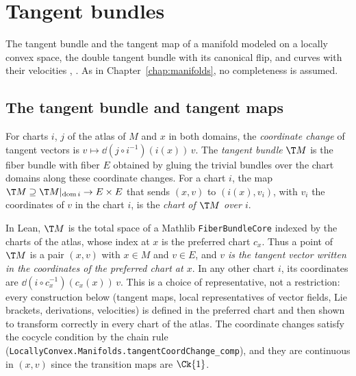 \chapter{Tangent bundles}
\label{chap:tangent}

The tangent bundle and the tangent map of a manifold modeled on a locally convex space, the
double tangent bundle with its canonical flip, and curves with their velocities
\cite[\S3.3]{GN26}, \cite[Ch.~III]{Lan99}. As in Chapter~\ref{chap:manifolds}, no completeness
is assumed.

\section{The tangent bundle and tangent maps}

\begin{definition}
  \label{def:tangent-bundle}
  \leanok
  For charts $i$, $j$ of the atlas of $M$ and $x$ in both domains, the \emph{coordinate change}
  of tangent vectors is $v \mapsto \dd(j \circ i^{-1})(i(x))\,v$. The \emph{tangent bundle}
  $\T M$ is the fiber bundle with fiber $E$ obtained by gluing the trivial bundles over the
  chart domains along these coordinate changes. For a chart $i$, the map
  $\T M \supseteq \T M|_{\operatorname{dom} i} \to E \times E$ that sends $(x, v)$ to
  $(i(x), v_i)$, with $v_i$ the coordinates of $v$ in the chart $i$, is the \emph{chart of $\T M$
  over $i$}.
\end{definition}

In Lean, $\T M$ is the total space of a Mathlib \texttt{FiberBundleCore} indexed by the charts of
the atlas, whose index at $x$ is the preferred chart $c_x$. Thus a point of $\T M$ is a pair
$(x, v)$ with $x \in M$ and $v \in E$, and \emph{$v$ is the tangent vector written in the
coordinates of the preferred chart at $x$}. In any other chart $i$, its coordinates are
$\dd(i \circ c_x^{-1})(c_x(x))\,v$. This is a choice of representative, not a restriction:
every construction below (tangent maps, local representatives of vector fields, Lie brackets,
derivations, velocities) is defined in the preferred chart and then shown to transform correctly
in every chart of the atlas. The coordinate changes satisfy the cocycle condition by the chain
rule (\texttt{LocallyConvex.Manifolds.tangentCoordChange\_comp}), and they are continuous in $(x, v)$ since
the transition maps are $\Ck{1}$.

